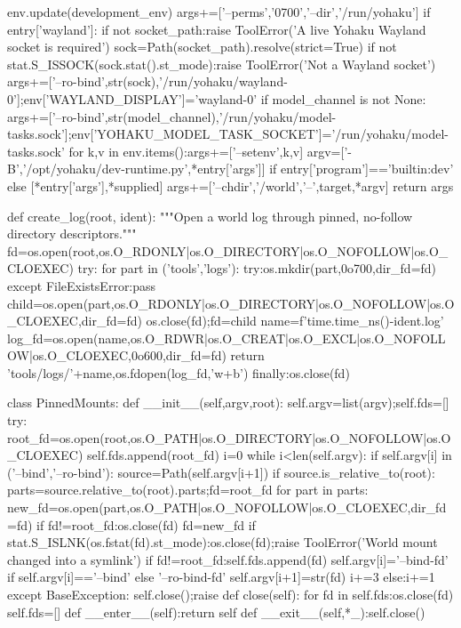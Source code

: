     env.update(development_env)
    args+=['--perms','0700','--dir','/run/yohaku']
    if entry['wayland']:
        if not socket_path:raise ToolError('A live Yohaku Wayland socket is required')
        sock=Path(socket_path).resolve(strict=True)
        if not stat.S_ISSOCK(sock.stat().st_mode):raise ToolError('Not a Wayland socket')
        args+=['--ro-bind',str(sock),'/run/yohaku/wayland-0'];env['WAYLAND_DISPLAY']='wayland-0'
    if model_channel is not None:
        args+=['--ro-bind',str(model_channel),'/run/yohaku/model-tasks.sock'];env['YOHAKU_MODEL_TASK_SOCKET']='/run/yohaku/model-tasks.sock'
    for k,v in env.items():args+=['--setenv',k,v]
    argv=['-B','/opt/yohaku/dev-runtime.py',*entry['args']] if entry['program']=='builtin:dev' else [*entry['args'],*supplied]
    args+=['--chdir','/world','--',target,*argv]
    return args

def create_log(root, ident):
    """Open a world log through pinned, no-follow directory descriptors."""
    fd=os.open(root,os.O_RDONLY|os.O_DIRECTORY|os.O_NOFOLLOW|os.O_CLOEXEC)
    try:
        for part in ('tools','logs'):
            try:os.mkdir(part,0o700,dir_fd=fd)
            except FileExistsError:pass
            child=os.open(part,os.O_RDONLY|os.O_DIRECTORY|os.O_NOFOLLOW|os.O_CLOEXEC,dir_fd=fd)
            os.close(fd);fd=child
        name=f'{time.time_ns()}-{ident}.log'
        log_fd=os.open(name,os.O_RDWR|os.O_CREAT|os.O_EXCL|os.O_NOFOLLOW|os.O_CLOEXEC,0o600,dir_fd=fd)
        return 'tools/logs/'+name,os.fdopen(log_fd,'w+b')
    finally:os.close(fd)

class PinnedMounts:
    def __init__(self,argv,root):
        self.argv=list(argv);self.fds=[]
        try:
            root_fd=os.open(root,os.O_PATH|os.O_DIRECTORY|os.O_NOFOLLOW|os.O_CLOEXEC)
            self.fds.append(root_fd)
            i=0
            while i<len(self.argv):
                if self.argv[i] in ('--bind','--ro-bind'):
                    source=Path(self.argv[i+1])
                    if source.is_relative_to(root):
                        parts=source.relative_to(root).parts;fd=root_fd
                        for part in parts:
                            new_fd=os.open(part,os.O_PATH|os.O_NOFOLLOW|os.O_CLOEXEC,dir_fd=fd)
                            if fd!=root_fd:os.close(fd)
                            fd=new_fd
                            if stat.S_ISLNK(os.fstat(fd).st_mode):os.close(fd);raise ToolError('World mount changed into a symlink')
                        if fd!=root_fd:self.fds.append(fd)
                        self.argv[i]='--bind-fd' if self.argv[i]=='--bind' else '--ro-bind-fd'
                        self.argv[i+1]=str(fd)
                    i+=3
                else:i+=1
        except BaseException:
            self.close();raise
    def close(self):
        for fd in self.fds:os.close(fd)
        self.fds=[]
    def __enter__(self):return self
    def __exit__(self,*_):self.close()

